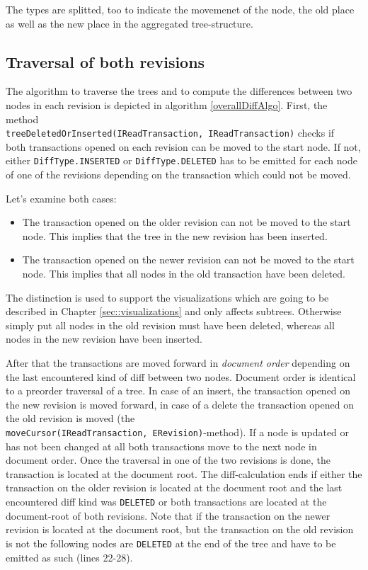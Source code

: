 The types are splitted, too to indicate the movemenet of the node, the old place as well as the new place in the aggregated tree-structure.

\subsection{Traversal of both revisions}
The algorithm to traverse the trees and to compute the differences between two nodes in each revision is depicted in algorithm \ref{overallDiffAlgo}. First, the method\\ \texttt{treeDeletedOrInserted(IReadTransaction, IReadTransaction)} checks if\\ both transactions opened on each revision can be moved to the start node. If not, either \texttt{DiffType.INSERTED} or \texttt{DiffType.DELETED} has to be emitted for each node of one of the revisions depending on the transaction which could not be moved.

Let's examine both cases:
\begin{itemize}
\item
The transaction opened on the older revision can not be moved to the start node. This implies that the tree in the new revision has been inserted.
\item
The transaction opened on the newer revision can not be moved to the start node. This implies that all nodes in the old transaction have been deleted.
\end{itemize}

The distinction is used to support the visualizations which are going to be described in Chapter \ref{sec::visualizations} and only affects subtrees. Otherwise simply put all nodes in the old revision must have been deleted, whereas all nodes in the new revision have been inserted.

After that the transactions are moved forward in \emph{document order} depending on the last encountered kind of diff between two nodes. Document order is identical to a preorder traversal of a tree. In case of an insert, the transaction opened on the new revision is moved forward, in case of a delete the transaction opened on the old revision is moved (the \\ \texttt{moveCursor(IReadTransaction, ERevision)}-method). If a node is updated or has not been changed at all both transactions move to the next node in document order. Once the traversal in one of the two revisions is done, the transaction is located at the document root. The diff-calculation ends if either the transaction on the older revision is located at the document root and the last encountered diff kind was \texttt{DELETED} or both transactions are located at the document-root of both revisions. Note that if the transaction on the newer revision is located at the document root, but the transaction on the old revision is not the following nodes are \texttt{DELETED} at the end of the tree and have to be emitted as such (lines 22-28). 

